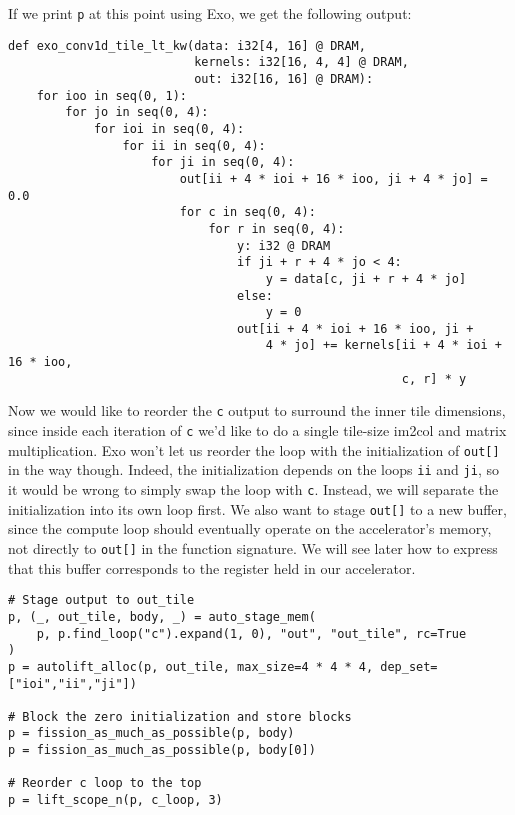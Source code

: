 \documentclass[acmsmall, nonacm=true]{acmart}
\begin{document}
If we print \verb|p| at this point using Exo, we get the following output:
\begin{verbatim}
def exo_conv1d_tile_lt_kw(data: i32[4, 16] @ DRAM,
                          kernels: i32[16, 4, 4] @ DRAM,
                          out: i32[16, 16] @ DRAM):
    for ioo in seq(0, 1):
        for jo in seq(0, 4):
            for ioi in seq(0, 4):
                for ii in seq(0, 4):
                    for ji in seq(0, 4):
                        out[ii + 4 * ioi + 16 * ioo, ji + 4 * jo] = 0.0
                        for c in seq(0, 4):
                            for r in seq(0, 4):
                                y: i32 @ DRAM
                                if ji + r + 4 * jo < 4:
                                    y = data[c, ji + r + 4 * jo]
                                else:
                                    y = 0
                                out[ii + 4 * ioi + 16 * ioo, ji +
                                    4 * jo] += kernels[ii + 4 * ioi + 16 * ioo,
                                                       c, r] * y
\end{verbatim}
Now we would like to reorder the \verb|c| output to surround the inner tile dimensions, since inside each iteration of \verb|c| we'd like to do a single tile-size im2col and matrix multiplication. Exo won't let us reorder the loop with the initialization of \verb|out[]| in the way though. Indeed, the initialization depends on the loops \verb|ii| and \verb|ji|, so it would be wrong to simply swap the loop with \verb|c|. Instead, we will separate the initialization into its own loop first. We also want to stage \verb|out[]| to a new buffer, since the compute loop should eventually operate on the accelerator's memory, not directly to \verb|out[]| in the function signature. We will see later how to express that this buffer corresponds to the register held in our accelerator. 

\begin{verbatim}
# Stage output to out_tile
p, (_, out_tile, body, _) = auto_stage_mem(
    p, p.find_loop("c").expand(1, 0), "out", "out_tile", rc=True
)
p = autolift_alloc(p, out_tile, max_size=4 * 4 * 4, dep_set=["ioi","ii","ji"])

# Block the zero initialization and store blocks
p = fission_as_much_as_possible(p, body)
p = fission_as_much_as_possible(p, body[0])

# Reorder c loop to the top
p = lift_scope_n(p, c_loop, 3)
\end{verbatim}
\end{document}
